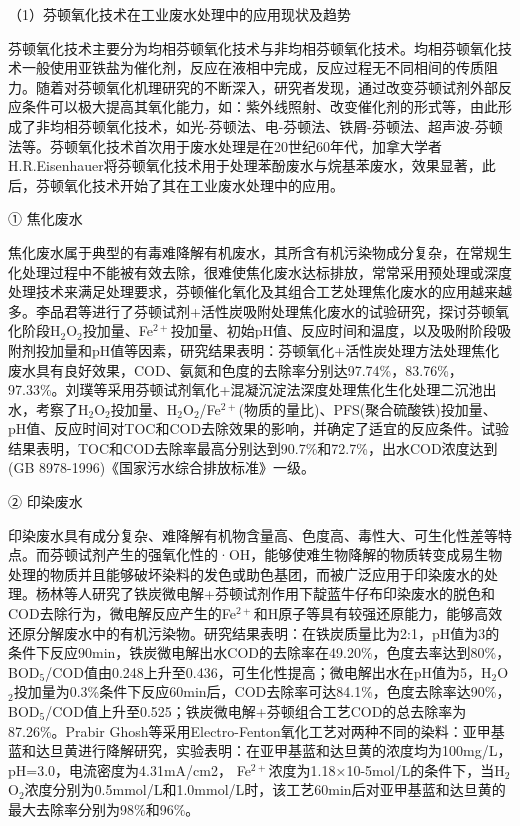 \par（1）芬顿氧化技术在工业废水处理中的应用现状及趋势

芬顿氧化技术主要分为均相芬顿氧化技术与非均相芬顿氧化技术。均相芬顿氧化技术一般使用亚铁盐为催化剂，反应在液相中完成，反应过程无不同相间的传质阻力。随着对芬顿氧化机理研究的不断深入，研究者发现，通过改变芬顿试剂外部反应条件可以极大提高其氧化能力，如：紫外线照射、改变催化剂的形式等，由此形成了非均相芬顿氧化技术，如光-芬顿法\cite{liuyongdi_1994}、电-芬顿法\cite{nanjilin_2017}、铁屑-芬顿法\cite{zhangwei_1997}、超声波-芬顿法\cite{zhaochangshuang_2014}等。芬顿氧化技术首次用于废水处理是在20世纪60年代，加拿大学者H.R.Eisenhauer将芬顿氧化技术用于处理苯酚废水与烷基苯废水，效果显著，此后，芬顿氧化技术开始了其在工业废水处理中的应用。

① 焦化废水

焦化废水属于典型的有毒难降解有机废水，其所含有机污染物成分复杂，在常规生化处理过程中不能被有效去除，很难使焦化废水达标排放，常常采用预处理或深度处理技术来满足处理要求，芬顿催化氧化及其组合工艺处理焦化废水的应用越来越多。李品君\cite{liupinjun_2011}等进行了芬顿试剂+活性炭吸附处理焦化废水的试验研究，探讨芬顿氧化阶段H$_2$O$_2$投加量、Fe$^{2+}$投加量、初始pH值、反应时间和温度，以及吸附阶段吸附剂投加量和pH值等因素，研究结果表明：芬顿氧化+活性炭处理方法处理焦化废水具有良好效果，COD、氨氮和色度的去除率分别达97.74\%，83.76\%，97.33\%。刘璞\cite{liupu_2013}等采用芬顿试剂氧化+混凝沉淀法深度处理焦化生化处理二沉池出水，考察了H$_2$O$_2$投加量、H$_2$O$_2$/Fe$^{2+}$(物质的量比)、PFS(聚合硫酸铁)投加量、pH值、反应时间对TOC和COD去除效果的影响，并确定了适宜的反应条件。试验结果表明，TOC和COD去除率最高分别达到90.7\%和72.7\%，出水COD浓度达到(GB 8978-1996)《国家污水综合排放标准》一级。

② 印染废水

印染废水具有成分复杂、难降解有机物含量高、色度高、毒性大、可生化性差等特点。而芬顿试剂产生的强氧化性的·OH，能够使难生物降解的物质转变成易生物处理的物质并且能够破坏染料的发色或助色基团，而被广泛应用于印染废水的处理。杨林\cite{yanglin_2012}等人研究了铁炭微电解+芬顿试剂作用下靛蓝牛仔布印染废水的脱色和COD去除行为，微电解反应产生的Fe$^{2+}$和H原子等具有较强还原能力，能够高效还原分解废水中的有机污染物。研究结果表明：在铁炭质量比为2:1，pH值为3的条件下反应90min，铁炭微电解出水COD的去除率在49.20\%，色度去率达到80\%，BOD$_5$/COD值由0.248上升至0.436，可生化性提高；微电解出水在pH值为5，H$_2$O$_2$投加量为0.3\%条件下反应60min后，COD去除率可达84.1\%，色度去除率达90\%，\linebreak BOD$_5$/COD值上升至0.525；铁炭微电解+芬顿组合工艺COD的总去除率为87.26\%。Prabir Ghosh\cite{ghosh_electro-fenton_2012}等采用Electro-Fenton氧化工艺对两种不同的染料：亚甲基蓝和达旦黄进行降解研究，实验表明：在亚甲基蓝和达旦黄的浓度均为100mg/L，pH=3.0，电流密度为\linebreak[0] 4.31mA/cm2， Fe$^{2+}$浓度为1.18×10-5mol/L的条件下，当H$_2$O$_2$浓度分别为0.5mmol/L和1.0mmol/L时，该工艺60min后对亚甲基蓝和达旦黄的最大去除率分别为98\%和96\%。

